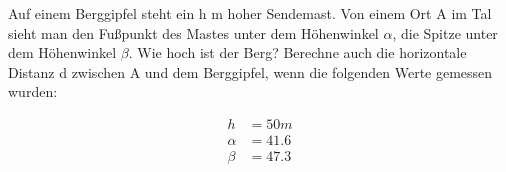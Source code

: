 
Auf einem Berggipfel steht ein h m hoher Sendemast. Von einem Ort A im Tal sieht man den Fußpunkt des Mastes
unter dem Höhenwinkel $\alpha$, die Spitze unter dem Höhenwinkel $\beta$. Wie hoch ist der Berg? Berechne
auch die horizontale Distanz d zwischen A und dem Berggipfel, wenn die folgenden Werte gemessen wurden:

\begin{align}
	h &= 50 m\\
	\alpha &= 41.6\\
	\beta &= 47.3
\end{align}
